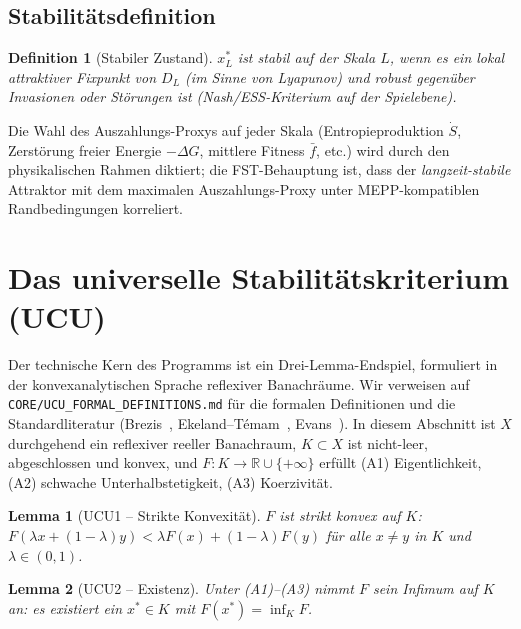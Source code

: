 \documentclass[11pt,a4paper]{article}
\newtheorem{definition}{Definition}
\newtheorem{lemma}{Lemma}
\theoremstyle{remark}
\begin{document}
\subsection{Stabilitätsdefinition}

\begin{definition}[Stabiler Zustand]
$x_L^*$ ist \emph{stabil} auf der Skala $L$, wenn es ein lokal attraktiver Fixpunkt von $D_L$ (im Sinne von Lyapunov) und robust gegenüber Invasionen oder Störungen ist (Nash/ESS-Kriterium auf der Spielebene).
\end{definition}

Die Wahl des Auszahlungs-Proxys auf jeder Skala (Entropieproduktion $\dot S$, Zerstörung freier Energie $-\Delta G$, mittlere Fitness $\bar f$, etc.) wird durch den physikalischen Rahmen diktiert; die FST-Behauptung ist, dass der \emph{langzeit-stabile} Attraktor mit dem maximalen Auszahlungs-Proxy unter MEPP-kompatiblen Randbedingungen korreliert.

\section{Das universelle Stabilitätskriterium (UCU)}
\label{sec:ucu}

Der technische Kern des Programms ist ein Drei-Lemma-Endspiel, formuliert in der konvexanalytischen Sprache reflexiver Banachräume. Wir verweisen auf \texttt{CORE/UCU\_FORMAL\_DEFINITIONS.md} für die formalen Definitionen und die Standardliteratur (Brezis~\cite{Brezis2011}, Ekeland--T\'emam~\cite{EkelandTemam1999}, Evans~\cite{Evans2010}). In diesem Abschnitt ist $X$ durchgehend ein reflexiver reeller Banachraum, $K \subset X$ ist nicht-leer, abgeschlossen und konvex, und $F : K \to \mathbb{R} \cup \{+\infty\}$ erfüllt (A1) Eigentlichkeit, (A2) schwache Unterhalbstetigkeit, (A3) Koerzivität.

\begin{lemma}[UCU1 -- Strikte Konvexität]
\label{lem:ucu1}
$F$ ist \emph{strikt konvex} auf $K$:
$F(\lambda x + (1{-}\lambda) y) < \lambda F(x) + (1{-}\lambda)F(y)$
für alle $x \neq y$ in $K$ und $\lambda \in (0,1)$.
\end{lemma}

\begin{lemma}[UCU2 -- Existenz]
\label{lem:ucu2}
Unter (A1)--(A3) nimmt $F$ sein Infimum auf $K$ an:
es existiert ein $x^* \in K$ mit $F(x^*) = \inf_K F$.
\end{lemma}
\end{document}
